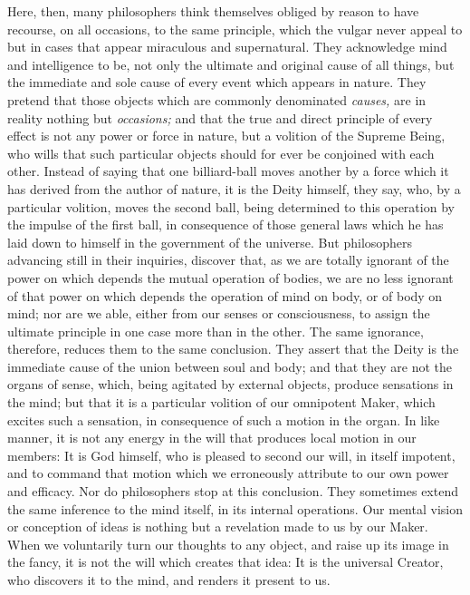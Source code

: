 \documentclass[]{article}
\begin{document}
\begin{sectionbody}
\humeparagraph  Here, then, many philosophers think themselves obliged by reason to have recourse, on all occasions, to the same principle, which the vulgar never appeal to but in cases that appear miraculous and supernatural. They acknowledge mind and intelligence to be, not only the ultimate and original cause of all things, but the immediate and sole cause of every event which appears in nature. They pretend that those objects which are commonly denominated \emph{causes,} are in reality nothing but \emph{occasions;} and that the true and direct principle of every effect is not any power or force in nature, but a volition of the Supreme Being, who wills that such particular objects should for ever be conjoined with each other. Instead of saying that one billiard-ball moves another by a force which it has derived from the author of nature, it is the Deity himself, they say, who, by a particular volition, moves the second ball, being determined to this operation by the impulse of the first ball, in consequence of those general laws which he has laid down to himself in the government of the universe. But philosophers advancing still in their inquiries, discover that, as we are totally ignorant of the power on which depends the mutual operation of bodies, we are no less ignorant of that power on which depends the operation of mind on body, or of body on mind; nor are we able, either from our senses or consciousness, to assign the ultimate principle in one case more than in the other. The same ignorance, therefore, reduces them to the same conclusion. They assert that the Deity is the immediate cause of the union between soul and body; and that they are not the organs of sense, which, being agitated by external objects, produce sensations in the mind; but that it is a particular volition of our omnipotent Maker, which excites such a sensation, in consequence of such a motion in the organ. In like manner, it is not any energy in the will that produces local motion in our members: It is God himself, who is pleased to second our will, in itself impotent, and to command that motion which we erroneously attribute to our own power and efficacy. Nor do philosophers stop at this conclusion. They sometimes extend the same inference to the mind itself, in its internal operations. Our mental vision or conception of ideas is nothing but a revelation made to us by our Maker. When we voluntarily turn our thoughts to any object, and raise up its image in the fancy, it is not the will which creates that idea: It is the universal Creator, who discovers it to the mind, and renders it present to us.


\end{sectionbody}
\end{document}
